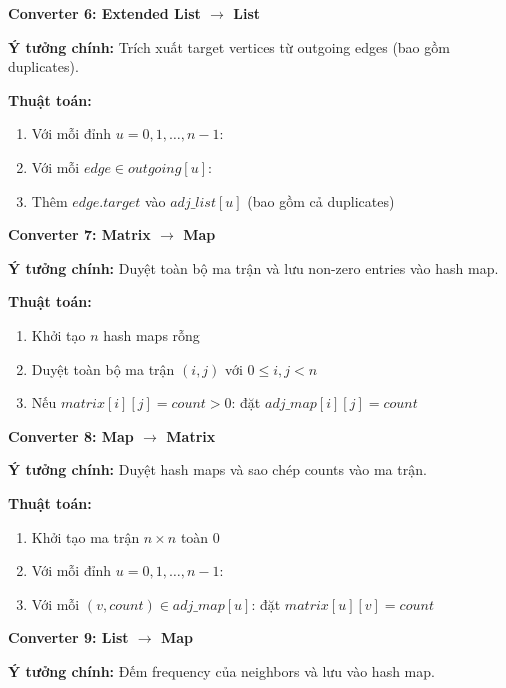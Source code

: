 \documentclass[12pt,a4paper]{article}
\begin{document}
\vspace{0.5cm}

\textbf{Converter 6: Extended List $\rightarrow$ List}

\textbf{Ý tưởng chính:} Trích xuất target vertices từ outgoing edges (bao gồm duplicates).

\textbf{Thuật toán:}
\begin{enumerate}
    \item Với mỗi đỉnh $u = 0, 1, \ldots, n-1$:
    \item Với mỗi $edge \in outgoing[u]$:
    \item Thêm $edge.target$ vào $adj\_list[u]$ (bao gồm cả duplicates)
\end{enumerate}

\vspace{0.5cm}

\textbf{Converter 7: Matrix $\rightarrow$ Map}

\textbf{Ý tưởng chính:} Duyệt toàn bộ ma trận và lưu non-zero entries vào hash map.

\textbf{Thuật toán:}
\begin{enumerate}
    \item Khởi tạo $n$ hash maps rỗng
    \item Duyệt toàn bộ ma trận $(i,j)$ với $0 \leq i,j < n$
    \item Nếu $matrix[i][j] = count > 0$: đặt $adj\_map[i][j] = count$
\end{enumerate}

\vspace{0.5cm}

\textbf{Converter 8: Map $\rightarrow$ Matrix}

\textbf{Ý tưởng chính:} Duyệt hash maps và sao chép counts vào ma trận.

\textbf{Thuật toán:}
\begin{enumerate}
    \item Khởi tạo ma trận $n \times n$ toàn $0$
    \item Với mỗi đỉnh $u = 0, 1, \ldots, n-1$:
    \item Với mỗi $(v, count) \in adj\_map[u]$: đặt $matrix[u][v] = count$
\end{enumerate}

\vspace{0.5cm}

\textbf{Converter 9: List $\rightarrow$ Map}

\textbf{Ý tưởng chính:} Đếm frequency của neighbors và lưu vào hash map.
\end{document}
